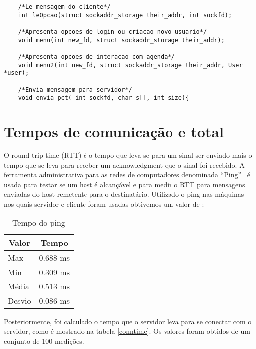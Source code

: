 \documentclass[10pt,a4paper]{article}
\begin{document}
\begin{itemize}
\begin{lstlisting}
    /*Le mensagem do cliente*/
    int leOpcao(struct sockaddr_storage their_addr, int sockfd);
    
    /*Apresenta opcoes de login ou criacao novo usuario*/
    void menu(int new_fd, struct sockaddr_storage their_addr);
    
    /*Apresenta opcoes de interacao com agenda*/
    void menu2(int new_fd, struct sockaddr_storage their_addr, User *user);

    /*Envia mensagem para servidor*/
    void envia_pct( int sockfd, char s[], int size){

    \end{lstlisting}


  \end{itemize}




  \section{Tempos de comunicação e total}
  O round-trip time (RTT) é o tempo que leva-se para um sinal ser
  enviado mais o tempo que se leva para receber um acknowledgment que o
  sinal foi recebido. A ferramenta administrativa para as redes de
  computadores denominada ``Ping''~\cite{Ping} é usada para testar se um host é alcançável e para
  medir o RTT para mensagens enviadas do host remetente para o
  destinatário.
  Utilizado o ping nas máquinas nos quais servidor e cliente foram
  usadas obtivemos um valor de :

  \begin{table}[h!]
    \begin{center}
        \begin{tabular}{lr}
          \multicolumn{1}{c}{Valor} & \multicolumn{1}{c}{Tempo}\\
          \hline
          Max & 0.688 ms\\
          Min & 0.309 ms\\
          Média & 0.513 ms \\
          Desvio & 0.086 ms
        \end{tabular}
        \label{pingtime}
    \end{center}
    \vspace{-5mm}
    \caption{Tempo do ping}
  \end{table}

  Posteriormente,  foi calculado o tempo que o servidor leva para se
  conectar com o servidor, como é mostrado na tabela \ref{conntime}. Os valores foram obtidos de um
  conjunto de 100 medições.
\end{document}
